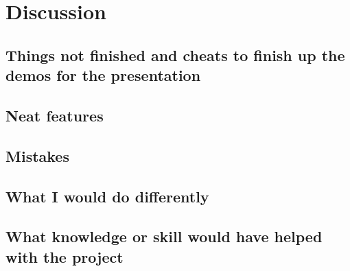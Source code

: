 \documentclass[letterpaper]{article}
\begin{document}
\section{Discussion}
\label{sec:discussion}

\subsection{Things not finished and cheats to finish up the demos for the presentation}
\subsection{Neat features}
\subsection{Mistakes}
\subsection{What I would do differently}
\subsection{What knowledge or skill would have helped with the project}

%
%
%
%
%   
\end{document}
